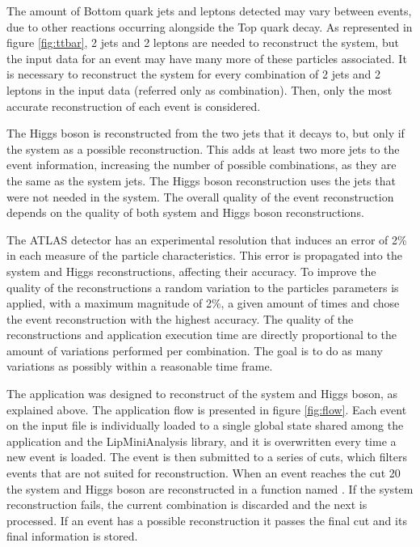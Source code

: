 The amount of Bottom quark jets and leptons detected may vary between events, due to other reactions occurring alongside the Top quark decay. As represented in figure \ref{fig:ttbar}, 2 jets and 2 leptons are needed to reconstruct the \ttbar system, but the input data for an event may have many more of these particles associated. It is necessary to reconstruct the system for every combination of 2 jets and 2 leptons in the input data (referred only as combination). Then, only the most accurate reconstruction of each event is considered.

The Higgs boson is reconstructed from the two jets that it decays to, but only if the \ttbar system as a possible reconstruction. This adds at least two more jets to the event information, increasing the number of possible combinations, as they are the same as the \ttbar system jets. The Higgs boson reconstruction uses the jets that were not needed in the \ttbar system. The overall quality of the event reconstruction depends on the quality of both \ttbar system and Higgs boson reconstructions.

The ATLAS detector has an experimental resolution that induces an error of 2\% in each measure of the particle characteristics. This error is propagated into the \ttbar system and Higgs reconstructions, affecting their accuracy. To improve the quality of the reconstructions a random variation to the particles parameters is applied, with a maximum magnitude of 2\%, a given amount of times and chose the event reconstruction with the highest accuracy. The quality of the reconstructions and application execution time are directly proportional to the amount of variations performed per combination. The goal is to do as many variations as possibly within a reasonable time frame.

The \tth application was designed to reconstruct of the \ttbar system and Higgs boson, as explained above. The application flow is presented in figure \ref{fig:flow}. Each event on the input file is individually loaded to a single global state shared among the application and the LipMiniAnalysis library, and it is overwritten every time a new event is loaded. The event is then submitted to a series of cuts, which filters events that are not suited for reconstruction. When an event reaches the cut 20 the \ttbar system and Higgs boson are reconstructed in a function named \ttDilepKinFit. If the \ttbar system reconstruction fails, the current combination is discarded and the next is processed. If an event has a possible reconstruction it passes the final cut and its final information is stored.

